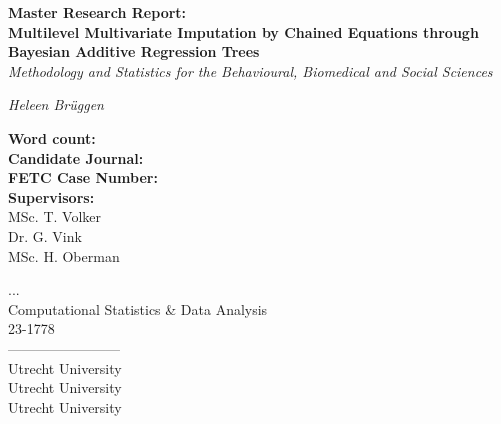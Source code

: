 \documentclass[10pt, a4paper, titlepage]{article}
\begin{document}
\begin{titlingpage}
\begin{center}
\Huge\textbf{Master Research Report:  \\ Multilevel Multivariate Imputation by Chained Equations through Bayesian Additive Regression Trees} \\
\Large\textit{Methodology and Statistics for the Behavioural, Biomedical and Social Sciences}

\vspace{.5cm}

\normalsize\textit{Heleen Brüggen}

\vspace{15cm}

\begin{minipage}{0.5\textwidth}
\begin{flushleft}

\textbf{Word count:} \\
\textbf{Candidate Journal:} \\
\textbf{FETC Case Number:} \\
\textbf{Supervisors:} \\
MSc. T. Volker \\
Dr. G. Vink \\
 MSc. H. Oberman
\end{flushleft}
\end{minipage}%
\begin{minipage}{0.5\textwidth}
\begin{flushright}

... \\
Computational Statistics \& Data Analysis \\
23-1778 \\
------------------------\\
Utrecht University \\
Utrecht University \\
Utrecht University
\end{flushright}
\end{minipage}

\end{center}
\end{titlingpage}

\newpage
\end{document}
